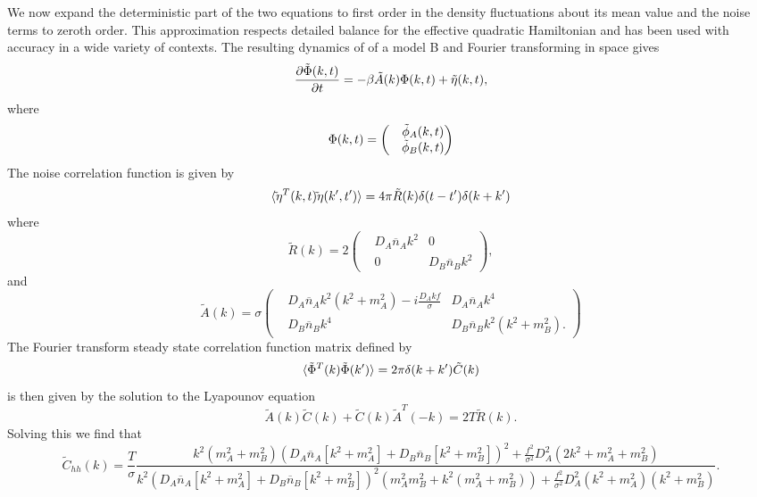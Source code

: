We now expand the deterministic part of the two equations to first order in the density fluctuations about its mean value and the noise terms to zeroth order. This approximation respects detailed balance for the effective quadratic Hamiltonian and has been used with accuracy in a wide variety of contexts. The resulting dynamics of of a model B and Fourier transforming in space gives
\begin{equation}
\frac{\partial \tilde{\boldmath \Phi}(k,t)}{\partial t}= -\beta \tilde A(k){\boldmath \Phi}(k,t) + {\boldmath \tilde\eta}(k,t),
\end{equation}
where
\begin{equation}
{\boldmath \Phi}(k,t) =\begin{pmatrix} &\tilde \phi_A(k,t) \\ &\tilde \phi_B(k,t)\end{pmatrix}
\end{equation}
The noise correlation function is given by
\begin{equation}
\langle {\tilde\boldmath\eta}^{T}(k,t) {\tilde\boldmath{\eta}}(k',t')\rangle = 4\pi\tilde R(k) \delta(t-t')\delta(k+k')
\end{equation}
where 
\begin{equation}\tilde R(k)= 2\begin{pmatrix} & D_A\overline n_A k^2 & 0\\
& 0 & D_B\overline n_B k^2\end{pmatrix},
\end{equation}
and 
\begin{equation}
\tilde A(k) =\sigma\begin{pmatrix}& D_A\overline n_A k^2(k^2 + m_A^2) -i\frac{D_A k f}{\sigma} & 
D_A\overline n_A k^4 \\ & D_B\overline n_B k^4 & D_B \overline n_B k^2(k^2 + m_B^2).\end{pmatrix}
\end{equation}
The Fourier transform steady state correlation function matrix defined by
\begin{equation}
\langle {\boldmath\tilde\Phi}^T(k){\boldmath\tilde\Phi}(k')\rangle =
2\pi \delta(k+k') \tilde C(k)
\end{equation}
is then given by the solution to the Lyapounov equation
\begin{equation}
\tilde A(k)\tilde C(k) + \tilde C(k)\tilde A^T(-k) = 2T \tilde R(k).
\end{equation}
Solving this we find that
\begin{equation}
\tilde C_{hh}(k)= \frac{T}{\sigma}\frac{k^2(m_A^2+m_B^2)(D_A\overline n_A[k^2+m_A^2] +D_B\overline n_B[k^2+m_B^2] )^2 +\frac{f^2 }{\sigma^2}D_A^2(2k^2+m_A^2 + m_B^2)}{k^2(D_A\overline n_A[k^2+m_A^2] +D_B\overline n_B[k^2+m_B^2] )^2(m_A^2 m_B^2 + k^2(m_A^2 +m_B^2))
+\frac{f^2 }{\sigma^2}D_A^2(k^2+m_A^2)(k^2+m_B^2)}.
\end{equation}
